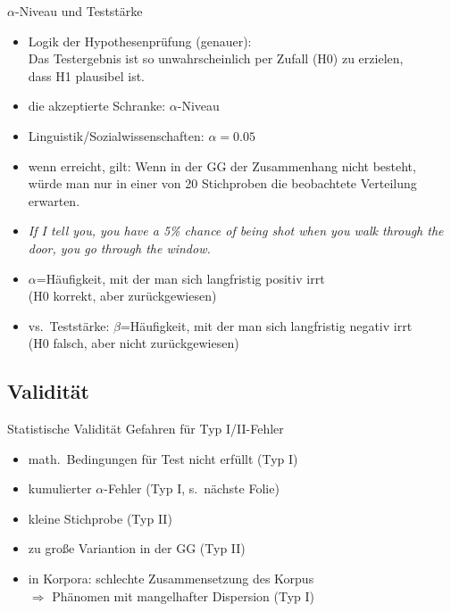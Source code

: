 \begin{frame}
  {$\alpha$-Niveau und Teststärke}
  \begin{itemize}
    \item Logik der Hypothesenprüfung (genauer):\\
      Das Testergebnis ist so unwahrscheinlich per Zufall (H0) zu erzielen,\\
      dass H1 plausibel ist.
    \item die akzeptierte Schranke: \alert{$\alpha$-Niveau}
    \item Linguistik\slash Sozialwissenschaften: \alert{$\alpha=0.05$}
    \item wenn erreicht, gilt: \alert{Wenn in der GG der Zusammenhang nicht besteht,\\
      würde man nur in einer von 20 Stichproben die beobachtete Verteilung erwarten.}
      \Zeile
    \item \textit{If I tell you, you have a 5\% chance of being shot when you walk through the door, you go through the window.}
      \Zeile
    \item $\alpha$=Häufigkeit, mit der man sich langfristig positiv irrt\\
      (H0 korrekt, aber zurückgewiesen)
    \item vs.\ \alert{Teststärke}: $\beta$=Häufigkeit, mit der man sich langfristig negativ irrt\\
      (H0 falsch, aber nicht zurückgewiesen)
  \end{itemize}
\end{frame}

\subsection{Validität}

\begin{frame}
  {Statistische Validität}
  Gefahren für Typ I\slash II-Fehler
  \begin{itemize}[<+->]
    \item math.\ Bedingungen für Test nicht erfüllt (Typ I)
    \item kumulierter $\alpha$-Fehler (Typ I, s.\ nächste Folie)
    \item kleine Stichprobe (Typ II)
    \item zu große Variantion in der GG (Typ II)
      \Zeile
    \item in Korpora: schlechte Zusammensetzung des Korpus\\
      $\Rightarrow$ Phänomen mit mangelhafter Dispersion (Typ I)
  \end{itemize}
\end{frame}

